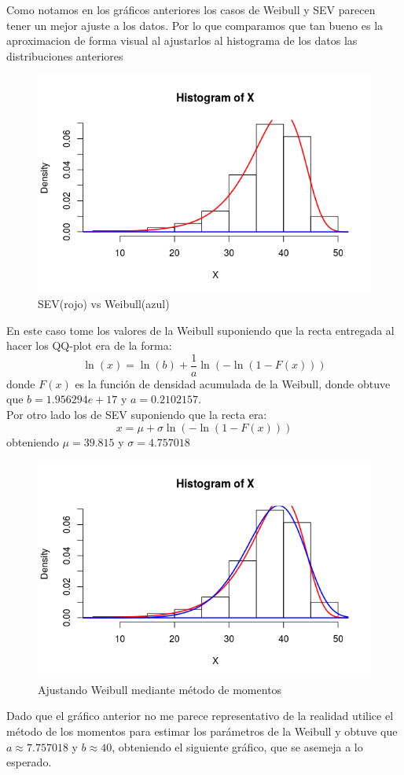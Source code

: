 \documentclass{article}
\begin{document}
Como notamos en los gráficos anteriores los casos de Weibull y SEV parecen tener un mejor ajuste a los datos. Por lo que comparamos que tan bueno es la aproximacion de forma visual al ajustarlos al histograma de los datos las distribuciones anteriores
\begin{figure}[h!]
\centering
\includegraphics[scale=0.5]{./figures/sev_vs_weibull.png}
\caption{SEV(rojo) vs Weibull(azul)}
\end{figure}
En este caso tome los valores de la Weibull suponiendo que la recta entregada al hacer los QQ-plot era de la forma:
$$\ln(x)=\ln(b)+\frac{1}{a}\ln(-\ln(1-F(x))) $$
donde $F(x)$ es la función de densidad acumulada de la Weibull, donde obtuve que $b=1.956294e+17$ y $a =0.2102157$. \\

Por otro lado los de SEV suponiendo que la recta era:
$$x=\mu+\sigma\ln(-\ln(1-F(x))) $$
obteniendo $\mu = 39.815 $ y $\sigma=4.757018$\\

\pagebreak
\begin{figure}[h!]
\centering
\includegraphics[scale=0.5]{./figures/version2.png}
\caption{Ajustando Weibull mediante método de momentos}
\end{figure}
Dado que el gráfico anterior no me parece representativo de la realidad utilice el método de los momentos para estimar los parámetros de la Weibull y obtuve que $a\approx 7.757018$ y $b\approx 40$, obteniendo el siguiente gráfico, que se asemeja a lo esperado.\\
\end{document}
